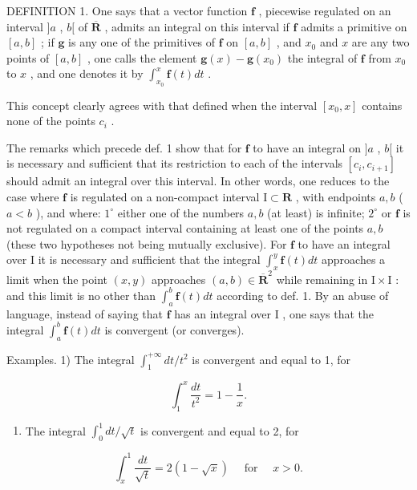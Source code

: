 DEFINITION 1. One says that a vector function \(\mathbf{f}\) , piecewise regulated on an interval \(]a\) , \(b[\) of \(\overline{\mathbf{R}}\) , admits an integral on this interval if \(\mathbf{f}\) admits a primitive on \([a, b]\) ; if \(\mathbf{g}\) is any one of the primitives of \(\mathbf{f}\) on \([a, b]\) , and \(x_0\) and \(x\) are any two points of \([a, b]\) , one calls the element \(\mathbf{g}(x) - \mathbf{g}(x_0)\) the integral of \(\mathbf{f}\) from \(x_0\) to \(x\) , and one denotes it by \(\int_{x_0}^x \mathbf{f}(t) dt\) .

This concept clearly agrees with that defined when the interval \([x_0, x]\) contains none of the points \(c_i\) .

The remarks which precede def. 1 show that for \(\mathbf{f}\) to have an integral on \(]a\) , \(b[\) it is necessary and sufficient that its restriction to each of the intervals \([c_i, c_{i+1}]\) should admit an integral over this interval. In other words, one reduces to the case where \(\mathbf{f}\) is regulated on a non-compact interval \(\mathrm{I} \subset \mathbf{R}\) , with endpoints \(a, b\) ( \(a < b\) ), and where: \(1^\circ\) either one of the numbers \(a, b\) (at least) is infinite; \(2^\circ\) or \(\mathbf{f}\) is not regulated on a compact interval containing at least one of the points \(a, b\) (these two hypotheses not being mutually exclusive). For \(\mathbf{f}\) to have an integral over \(\mathrm{I}\) it is necessary and sufficient that the integral \(\int_x^y \mathbf{f}(t) dt\) approaches a limit when the point \((x, y)\) approaches \((a, b) \in \overline{\mathbf{R}}^2\) while remaining in \(\mathrm{I} \times \mathrm{I}\) : and this limit is no other than \(\int_a^b \mathbf{f}(t) dt\) according to def. 1. By an abuse of language, instead of saying that \(\mathbf{f}\) has an integral over \(\mathrm{I}\) , one says that the integral \(\int_a^b \mathbf{f}(t) dt\) is convergent (or converges).

Examples. 1) The integral \(\int_{1}^{+\infty} dt / t^{2}\) is convergent and equal to 1, for

\[
\int_ {1} ^ {x} \frac {d t}{t ^ {2}} = 1 - \frac {1}{x}.
\]

\begin{enumerate}
\def\labelenumi{\arabic{enumi})}
\setcounter{enumi}{1}
\tightlist
\item
  The integral \(\int_0^1 dt / \sqrt{t}\) is convergent and equal to 2, for
\end{enumerate}

\[
\int_ {x} ^ {1} \frac {d t}{\sqrt {t}} = 2 (1 - \sqrt {x}) \quad \text { for } \quad x > 0.
\]

